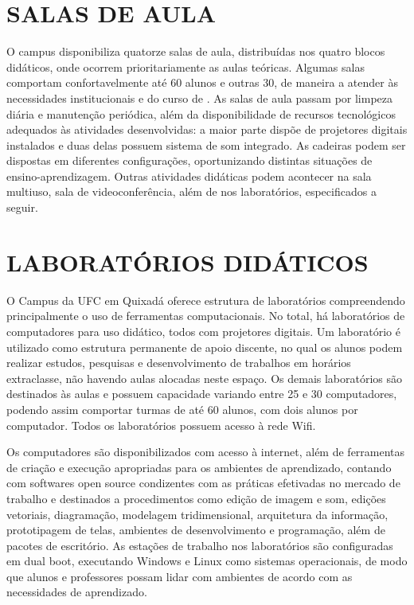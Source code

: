 \section{SALAS DE AULA}

O campus disponibiliza quatorze salas de aula, distribuídas nos quatro blocos didáticos, onde ocorrem prioritariamente as aulas teóricas. Algumas salas comportam confortavelmente até 60 alunos e outras 30, de maneira a atender às necessidades institucionais e do curso de \nomedocurso. As salas de aula passam por limpeza diária e manutenção periódica, além da disponibilidade de recursos tecnológicos adequados às atividades desenvolvidas: a maior parte dispõe de projetores digitais instalados e duas delas possuem sistema de som integrado. As cadeiras podem ser dispostas em diferentes configurações, oportunizando distintas situações de ensino-aprendizagem. Outras atividades didáticas podem acontecer na sala multiuso, sala de videoconferência, além de nos laboratórios, especificados a seguir.

\section{LABORATÓRIOS DIDÁTICOS}

O Campus da UFC em Quixadá oferece estrutura de laboratórios compreendendo principalmente o uso de ferramentas computacionais. No total, há \ufcNumLab laboratórios de computadores para uso didático, todos com projetores digitais. Um laboratório é utilizado como estrutura permanente de apoio discente, no qual os alunos podem realizar estudos, pesquisas e desenvolvimento de trabalhos em horários extraclasse, não havendo aulas alocadas neste espaço. Os demais laboratórios são destinados às aulas e possuem capacidade variando entre 25 e 30 computadores, podendo assim comportar turmas de até 60 alunos, com dois alunos por computador. Todos os laboratórios possuem acesso à rede Wifi. 

Os computadores são disponibilizados com acesso à internet, além de ferramentas de criação e execução apropriadas para os ambientes de aprendizado, contando com softwares open source condizentes com as práticas efetivadas no mercado de trabalho e destinados a procedimentos como edição de imagem e som, edições vetoriais, diagramação, modelagem tridimensional, arquitetura da informação, prototipagem de telas, ambientes de desenvolvimento e programação, além de pacotes de escritório. As estações de trabalho nos laboratórios são configuradas em dual boot, executando Windows e Linux como sistemas operacionais, de modo que alunos e professores possam lidar com ambientes de acordo com as necessidades de aprendizado.

